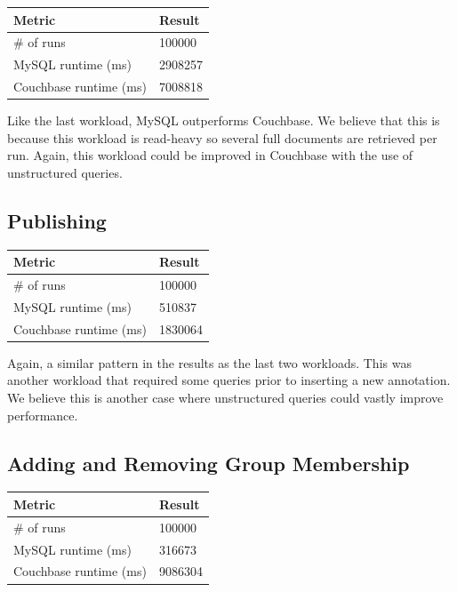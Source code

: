 \documentclass[]{IEEEtran}
\begin{document}
\begin{center}
\begin{tabular}{|l|l|}
	\hline
	{\bf Metric} & {\bf Result} \\
	\hline
        \# of runs & 100000 \\
        \hline
        MySQL runtime (ms) & 2908257 \\
	\hline
        Couchbase runtime (ms) & 7008818 \\
        \hline
\end{tabular}
\end{center}

Like the last workload, MySQL outperforms Couchbase. We believe that this is because this workload is read-heavy so several
full documents are retrieved per run.  Again, this workload could be improved in Couchbase with the use of unstructured queries.

\subsection{Publishing}

\begin{center}
\begin{tabular}{|l|l|}
	\hline
	{\bf Metric} & {\bf Result} \\
	\hline
        \# of runs & 100000 \\
        \hline
        MySQL runtime (ms) & 510837 \\
	\hline
        Couchbase runtime (ms) & 1830064 \\
        \hline
\end{tabular}
\end{center}

Again, a similar pattern in the results as the last two workloads. This was another workload that required some queries prior to inserting
a new annotation. We believe this is another case where unstructured queries could vastly improve performance.

\subsection{Adding and Removing Group Membership}

\begin{center}
\begin{tabular}{|l|l|}
	\hline
	{\bf Metric} & {\bf Result} \\
	\hline
        \# of runs & 100000 \\
        \hline
        MySQL runtime (ms) & 316673 \\
	\hline
        Couchbase runtime (ms) & 9086304 \\
        \hline
\end{tabular}
\end{center}
\end{document}
